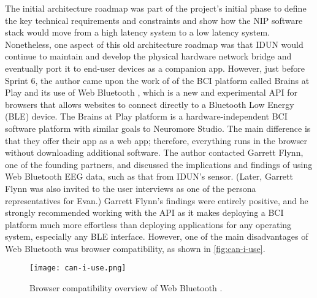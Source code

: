 The initial architecture roadmap was part of the project’s initial phase to define the key technical requirements and constraints and show how the NIP software stack would move from a high latency system to a low latency system. Nonetheless, one aspect of this old architecture roadmap was that IDUN would continue to maintain and develop the physical hardware network bridge and eventually port it to end-user devices as a companion app. However, just before Sprint 6, the author came upon the work of \citeauthor{flynn_brainsplay_nodate} of the BCI platform called Brains at Play and its use of Web Bluetooth \citep{brainsplay_add_nodate}, which is a new and experimental API for browsers that allows websites to connect directly to a Bluetooth Low Energy (BLE) device. The Brains at Play platform is a hardware-independent BCI software platform with similar goals to Neuromore Studio. The main difference is that they offer their app as a web app; therefore, everything runs in the browser without downloading additional software. The author contacted Garrett Flynn, one of the founding partners, and discussed the implications and findings of using Web Bluetooth EEG data, such as that from IDUN’s sensor. (Later, Garrett Flynn was also invited to the user interviews as one of the persona representatives for Evan.) Garrett Flynn’s findings were entirely positive, and he strongly recommended working with the API as it makes deploying a BCI platform much more effortless than deploying applications for any operating system, especially any BLE interface. However, one of the main disadvantages of Web Bluetooth was browser compatibility, as shown in \autoref{fig:can-i-use}.

\begin{figure}[!ht]
  \centering
  \texttt{[image: can-i-use.png]}
  \caption[Browser compatibility overview of Web Bluetooth.]{Browser compatibility overview of Web Bluetooth \citep{caniuse_web_nodate}.}
  \label{fig:can-i-use}
\end{figure}


